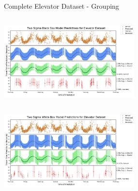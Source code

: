 \documentclass{beamer}
\begin{document}
\begin{frame}[t]{Complete Elevator Dataset - Grouping}

  \vspace*{-0.9cm}
  \begin{columns}[t]
    {\includegraphics[width = 2.8in]{images/elevator/two_sigma_black_box_model_predictions_for_elevator_dataset.png}}

    \begin{overlayarea}{0.5\textwidth}{0.5\textheight}


    \end{overlayarea}
  \end{columns}
  \vspace*{-0.3cm}

  \begin{columns}[t]

    {\includegraphics[width = 2.8in]{images/elevator/two_sigma_white_box_model_predictions_for_elevator_dataset.png}}
  \end{columns}

\end{frame}
\end{document}
